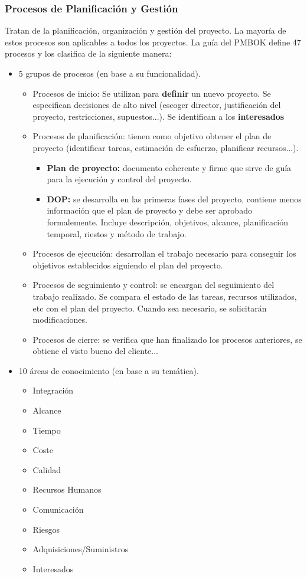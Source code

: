 \documentclass{article}
\begin{document}
\subsubsection{Procesos de Planificación y Gestión}
Tratan de la planificación, organización y gestión del proyecto. La mayoría de estos procesos son aplicables a todos los proyectos. La guía del PMBOK define 47 procesos y los clasifica de la siguiente manera:
\begin{itemize}
	\item 5 grupos de procesos (en base a su funcionalidad).
	\begin{itemize}
		\item Procesos de inicio: Se utilizan para \textbf{definir} un nuevo proyecto. Se especifican decisiones de alto nivel (escoger director, justificación del proyecto, restricciones, supuestos...). Se identifican a los \textbf{interesados}
		\item Procesos de planificación: tienen como objetivo obtener el plan de proyecto (identificar tareas, estimación de esfuerzo, planificar recursos...).
		\begin{itemize}
		\item \textbf{Plan de proyecto:} documento coherente y firme que sirve de guía para la ejecución y control del proyecto.
		\item \textbf{DOP:} se desarrolla en las primeras fases del proyecto, contiene menos información que el plan de proyecto y debe ser aprobado formalemente. Incluye descripción, objetivos, alcance, planificación temporal, riestos y método de trabajo.
		\end{itemize}
		\item Procesos de ejecución: desarrollan el trabajo necesario para conseguir los objetivos establecidos siguiendo el plan del proyecto.
		\item Procesos de seguimiento y control: se encargan del seguimiento del trabajo realizado. Se compara el estado de las tareas, recursos utilizados, etc con el plan del proyecto. Cuando sea necesario, se solicitarán modificaciones. 
		\item Procesos de cierre: se verifica que han finalizado los procesos anteriores, se obtiene el visto bueno del cliente...
	\end{itemize}
	\item 10 áreas de conocimiento (en base a su temática).
	\begin{itemize}
		\item Integración
		\item Alcance
		\item Tiempo
		\item Coste
		\item Calidad
		\item Recursos Humanos
		\item Comunicación
		\item Riesgos
		\item Adquisiciones/Suministros
		\item Interesados
	\end{itemize}
\end{itemize}
\end{document}
